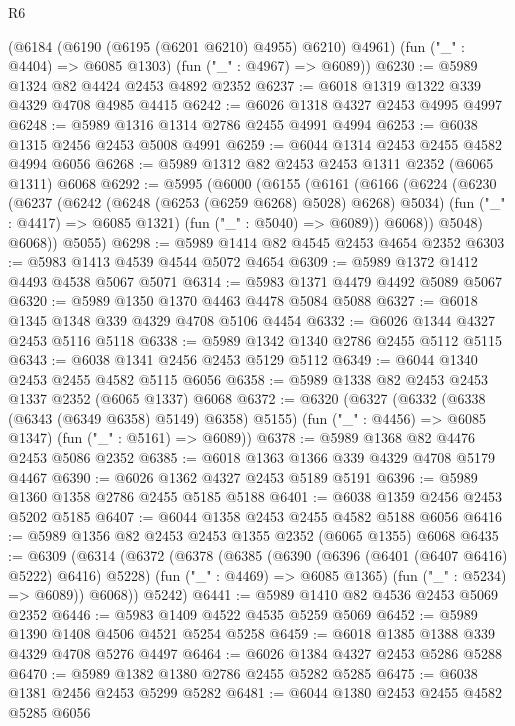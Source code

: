 \begin{lexlean}{R6}
\begin{coremodule}
      (@6184 (@6190 (@6195 (@6201 @6210) @4955) @6210) @4961)
      (fun ("_" : @4404) => @6085 @1303)
      (fun ("_" : @4967) => @6089))
@6230 := @5989 @1324 @82 @4424 @2453 @4892 @2352
@6237 := @6018 @1319 @1322 @339 @4329 @4708 @4985 @4415
@6242 := @6026 @1318 @4327 @2453 @4995 @4997
@6248 := @5989 @1316 @1314 @2786 @2455 @4991 @4994
@6253 := @6038 @1315 @2456 @2453 @5008 @4991
@6259 := @6044 @1314 @2453 @2455 @4582 @4994 @6056
@6268 := @5989 @1312 @82 @2453 @2453 @1311 @2352 (@6065 @1311) @6068
@6292 := @5995
    (@6000
      (@6155
        (@6161
          (@6166
            (@6224
              (@6230
                (@6237
                  (@6242 (@6248 (@6253 (@6259 @6268) @5028) @6268) @5034)
                  (fun ("_" : @4417) => @6085 @1321)
                  (fun ("_" : @5040) => @6089))
                @6068))
            @5048)
          @6068))
      @5055)
@6298 := @5989 @1414 @82 @4545 @2453 @4654 @2352
@6303 := @5983 @1413 @4539 @4544 @5072 @4654
@6309 := @5989 @1372 @1412 @4493 @4538 @5067 @5071
@6314 := @5983 @1371 @4479 @4492 @5089 @5067
@6320 := @5989 @1350 @1370 @4463 @4478 @5084 @5088
@6327 := @6018 @1345 @1348 @339 @4329 @4708 @5106 @4454
@6332 := @6026 @1344 @4327 @2453 @5116 @5118
@6338 := @5989 @1342 @1340 @2786 @2455 @5112 @5115
@6343 := @6038 @1341 @2456 @2453 @5129 @5112
@6349 := @6044 @1340 @2453 @2455 @4582 @5115 @6056
@6358 := @5989 @1338 @82 @2453 @2453 @1337 @2352 (@6065 @1337) @6068
@6372 := @6320
    (@6327
      (@6332 (@6338 (@6343 (@6349 @6358) @5149) @6358) @5155)
      (fun ("_" : @4456) => @6085 @1347)
      (fun ("_" : @5161) => @6089))
@6378 := @5989 @1368 @82 @4476 @2453 @5086 @2352
@6385 := @6018 @1363 @1366 @339 @4329 @4708 @5179 @4467
@6390 := @6026 @1362 @4327 @2453 @5189 @5191
@6396 := @5989 @1360 @1358 @2786 @2455 @5185 @5188
@6401 := @6038 @1359 @2456 @2453 @5202 @5185
@6407 := @6044 @1358 @2453 @2455 @4582 @5188 @6056
@6416 := @5989 @1356 @82 @2453 @2453 @1355 @2352 (@6065 @1355) @6068
@6435 := @6309
    (@6314
      (@6372
        (@6378
          (@6385
            (@6390 (@6396 (@6401 (@6407 @6416) @5222) @6416) @5228)
            (fun ("_" : @4469) => @6085 @1365)
            (fun ("_" : @5234) => @6089))
          @6068))
      @5242)
@6441 := @5989 @1410 @82 @4536 @2453 @5069 @2352
@6446 := @5983 @1409 @4522 @4535 @5259 @5069
@6452 := @5989 @1390 @1408 @4506 @4521 @5254 @5258
@6459 := @6018 @1385 @1388 @339 @4329 @4708 @5276 @4497
@6464 := @6026 @1384 @4327 @2453 @5286 @5288
@6470 := @5989 @1382 @1380 @2786 @2455 @5282 @5285
@6475 := @6038 @1381 @2456 @2453 @5299 @5282
@6481 := @6044 @1380 @2453 @2455 @4582 @5285 @6056

\end{coremodule}
\end{lexlean}
